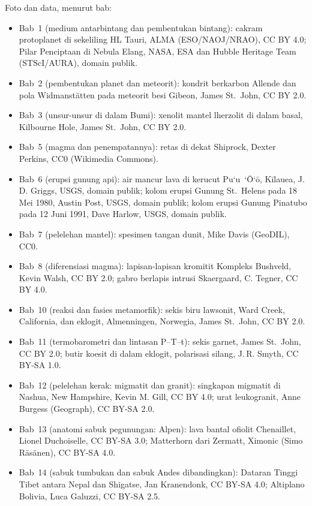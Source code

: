 \bigskip
\noindent Foto dan data, menurut bab:
\begin{itemize}\small
  \item Bab~1 (medium antarbintang dan pembentukan bintang): cakram protoplanet di sekeliling HL Tauri, ALMA (ESO/NAOJ/NRAO), CC BY 4.0; Pilar Penciptaan di Nebula Elang, NASA, ESA dan Hubble Heritage Team (STScI/AURA), domain publik.
  \item Bab~2 (pembentukan planet dan meteorit): kondrit berkarbon Allende dan pola Widmanstätten pada meteorit besi Gibeon, James St.~John, CC BY 2.0.
  \item Bab~3 (unsur-unsur di dalam Bumi): xenolit mantel lherzolit di dalam basal, Kilbourne Hole, James St.~John, CC BY 2.0.
  \item Bab~5 (magma dan penempatannya): retas di dekat Shiprock, Dexter Perkins, CC0 (Wikimedia Commons).
  \item Bab~6 (erupsi gunung api): air mancur lava di kerucut Pu`u~`\=O`\=o, Kīlauea, J.\,D. Griggs, USGS, domain publik; kolom erupsi Gunung St.~Helens pada 18 Mei 1980, Austin Post, USGS, domain publik; kolom erupsi Gunung Pinatubo pada 12 Juni 1991, Dave Harlow, USGS, domain publik.
  \item Bab~7 (pelelehan mantel): spesimen tangan dunit, Mike Davis (GeoDIL), CC0.
  \item Bab~8 (diferensiasi magma): lapisan-lapisan kromitit Kompleks Bushveld, Kevin Walsh, CC BY 2.0; gabro berlapis intrusi Skaergaard, C. Tegner, CC BY 4.0.
  \item Bab~10 (reaksi dan fasies metamorfik): sekis biru lawsonit, Ward Creek, California, dan eklogit, Almenningen, Norwegia, James St.~John, CC BY 2.0.
  \item Bab~11 (termobarometri dan lintasan P--T--t): sekis garnet, James St.~John, CC BY 2.0; butir koesit di dalam eklogit, polarisasi silang, J.\,R. Smyth, CC BY-SA 1.0.
  \item Bab~12 (pelelehan kerak: migmatit dan granit): singkapan migmatit di Nashua, New Hampshire, Kevin M. Gill, CC BY 4.0; urat leukogranit, Anne Burgess (Geograph), CC BY-SA 2.0.
  \item Bab~13 (anatomi sabuk pegunungan: Alpen): lava bantal ofiolit Chenaillet, Lionel Duchoiselle, CC BY-SA 3.0; Matterhorn dari Zermatt, Ximonic (Simo Räsänen), CC BY-SA 4.0.
  \item Bab~14 (sabuk tumbukan dan sabuk Andes dibandingkan): Dataran Tinggi Tibet antara Nepal dan Shigatse, Jan Kranendonk, CC BY-SA 4.0; Altiplano Bolivia, Luca Galuzzi, CC BY-SA 2.5.

\end{itemize}
